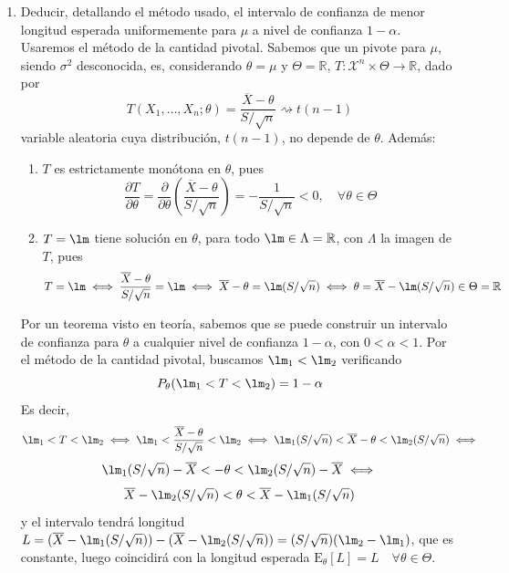 \documentclass[12pt]{article}
\newcommand{\E}{\mathrm{E}}
\newcommand{\R}{\mathbb{R}}
\newcommand{\X}{\mathcal{X}}
\begin{document}
\begin{ejercicio}[2 puntos]
\begin{enumerate}[label=\alph*)]
            \newpage

            \item Deducir, detallando el método usado, el intervalo de confianza de menor longitud esperada uniformemente para $\mu$ a nivel de confianza $1-\alpha$. \\
            
            Usaremos el método de la cantidad pivotal. Sabemos que un pivote para $\mu$, siendo $\sigma^2$ desconocida, es, considerando $\theta = \mu$ y $\Theta = \R$, $T : \X^n \times \Theta \to \R$, dado por
            $$T(X_1, \ldots, X_n; \theta) = \dfrac{\overline{X} - \theta}{S / \sqrt{n}} \rightsquigarrow t(n-1)$$
            variable aleatoria cuya distribución, $t(n-1)$, no depende de $\theta$.
            Además:
            \begin{enumerate}
                \item $T$ es estrictamente monótona en $\theta$, pues
                $$\dfrac{\partial T}{\partial \theta} = \dfrac{\partial}{\partial \theta} \left( \dfrac{\overline{X} - \theta}{S / \sqrt{n}} \right) = - \dfrac{1}{S / \sqrt{n}} < 0, \quad \forall \theta \in \Theta$$
                \item $T = \lm$ tiene solución en $\theta$, para todo $\lm \in \Lambda = \R$, con $\Lambda$ la imagen de $T$, pues
                $$T = \lm \iff \dfrac{\overline{X} - \theta}{S / \sqrt{n}} = \lm \iff \overline{X} - \theta = \lm(S / \sqrt{n}) \iff \theta = \overline{X} - \lm(S / \sqrt{n}) \in \Theta = \R$$ 
            \end{enumerate}
            Por un teorema visto en teoría, sabemos que se puede construir un intervalo de confianza para $\theta$ a cualquier nivel
            de confianza $1-\alpha$, con $0 < \alpha < 1$. Por el método de la cantidad pivotal, buscamos $\lm_1 < \lm_2$ 
            verificando $$P_\theta(\lm_1 < T < \lm_2) = 1 - \alpha$$
            Es decir,
            $$\lm_1 < T < \lm_2 \iff \lm_1 < \dfrac{\overline{X} - \theta}{S / \sqrt{n}} < \lm_2 \iff \lm_1(S / \sqrt{n}) < \overline{X} - \theta < \lm_2(S / \sqrt{n}) \iff$$
            $$\lm_1(S / \sqrt{n}) - \overline{X} < - \theta < \lm_2(S / \sqrt{n}) - \overline{X} \iff$$
            $$\overline{X} - \lm_2(S / \sqrt{n}) < \theta < \overline{X} - \lm_1(S / \sqrt{n})$$
            y el intervalo tendrá longitud $L = (\overline{X} - \lm_1(S / \sqrt{n})) - (\overline{X} - \lm_2(S / \sqrt{n})) = (S / \sqrt{n})(\lm_2 - \lm_1)$, que es constante, luego coincidirá 
            con la longitud esperada $\E_\theta[L] = L \quad \forall \theta \in \Theta$. \\
            

\end{enumerate}
\end{ejercicio}
\end{document}
